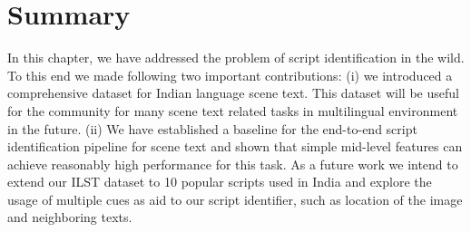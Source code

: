 \section{Summary}
In this chapter, we have addressed the problem of script identification in the wild. To this end we made following two important contributions: (i) we introduced a comprehensive dataset for Indian language scene text. This dataset will be useful for the community 
for many scene text related tasks in multilingual environment in the future. (ii) We have established a baseline for the end-to-end script identification pipeline for scene text and shown that simple mid-level features can achieve reasonably high performance for this task. As a future work we intend to extend our ILST dataset to 10 popular scripts used in India and explore the usage of multiple cues as aid to our script identifier, such as location of the image and neighboring texts. 

\label{sec:con}
